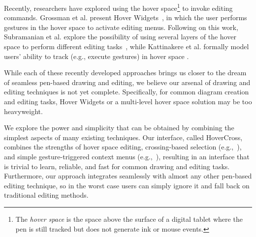 \documentclass{article}
\begin{document}
Recently, researchers have explored using the hover space\footnote{The
\textit{hover space} is the space above the surface of a digital
tablet where the pen is still tracked but does not generate ink or
mouse events.} to invoke editing commands.  Grossman et al. present
Hover Widgets~\cite{Grossman2006Hover}, in which the user performs
gestures in the hover space to activate editing menus.  Following on
this work, Subramanian et al. explore the possibility of using several
layers of the hover space to perform different editing
tasks~\cite{Subramanian2006Multilayer}, while Kattinakere et
al. formally model users' ability to track (e.g., execute gestures) in
hover space \cite{Kattinakere2007Modeling}.


While each of these recently developed approaches brings us closer to
the dream of seamless pen-based drawing and editing, we believe our
arsenal of drawing and editing techniques is not yet complete.
Specifically, for common diagram creation and editing tasks, Hover
Widgets or a multi-level hover space solution may be too heavyweight.

We explore the power and simplicity that can be obtained by combining
the simplest aspects of many existing techniques.  Our interface,
called HoverCross, combines the strengths of hover space editing,
crossing-based selection (e.g.,~\cite{Apitz2004Crossy}), and simple
gesture-triggered context menus (e.g.,~\cite{Hinckley2005Design}),
resulting in an interface that is trivial to learn, reliable, and fast
for common drawing and editing tasks.  Furthermore, our
approach integrates seamlessly with almost any other pen-based editing
technique, so in the worst case users can simply ignore it and fall
back on traditional editing methods.


\end{document}
